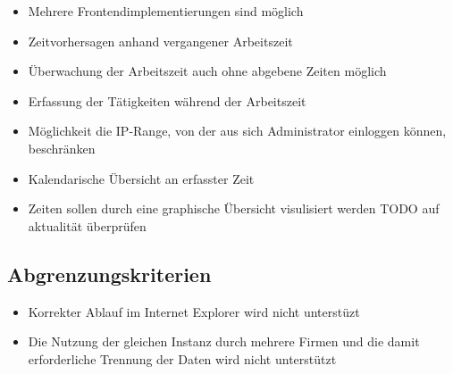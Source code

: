 \begin{itemize}
	\item Mehrere Frontendimplementierungen sind möglich
	\item Zeitvorhersagen anhand vergangener Arbeitszeit
	\item Überwachung der Arbeitszeit auch ohne abgebene Zeiten möglich
	\item Erfassung der Tätigkeiten während der Arbeitszeit
	\item Möglichkeit die IP-Range, von der aus sich Administrator einloggen können, beschränken
	\item Kalendarische Übersicht an erfasster Zeit
	\item Zeiten sollen durch eine graphische Übersicht visulisiert werden TODO auf aktualität überprüfen
\end{itemize}


\subsection{Abgrenzungskriterien}
\begin{itemize}
	\item Korrekter Ablauf im Internet Explorer wird nicht unterstüzt
	\item Die Nutzung der gleichen Instanz durch mehrere Firmen und die damit erforderliche Trennung der Daten wird nicht unterstützt
\end{itemize}

